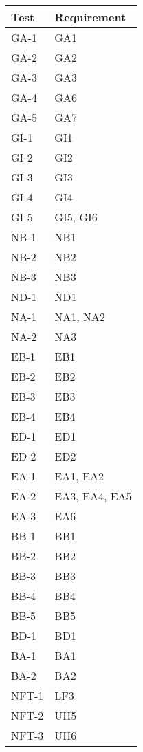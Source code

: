 \documentclass[12pt, titlepage]{article}
\begin{document}
\begin{longtable}{| p{} | p{} |}
    \hline
    Test & Requirement\\
    \hline
    GA-1 & GA1\\
    \hline
    GA-2 & GA2\\
    \hline
    GA-3 & GA3\\
    \hline
    GA-4 & GA6\\
    \hline
    GA-5 & GA7\\
    \hline
    GI-1 & GI1\\
    \hline
    GI-2 & GI2\\
    \hline
    GI-3 & GI3\\
    \hline
    GI-4 & GI4\\
    \hline
    GI-5 & GI5, GI6\\
    \hline
    NB-1 & NB1\\
    \hline
    NB-2 & NB2\\
    \hline
    NB-3 & NB3\\
    \hline
    ND-1 & ND1\\
    \hline
    NA-1 & NA1, NA2\\
    \hline
    NA-2 & NA3\\
    \hline
    EB-1 & EB1\\
    \hline
    EB-2 & EB2\\
    \hline
    EB-3 & EB3\\
    \hline
    EB-4 & EB4\\
    \hline
    ED-1 & ED1\\
    \hline
    ED-2 & ED2\\
    \hline
    EA-1 & EA1, EA2\\
    \hline
    EA-2 & EA3, EA4, EA5\\
    \hline
    EA-3 & EA6\\
    \hline
    BB-1 & BB1\\
    \hline
    BB-2 & BB2\\
    \hline
    BB-3 & BB3\\
    \hline
    BB-4 & BB4\\
    \hline
    BB-5 & BB5\\
    \hline
    BD-1 & BD1\\
    \hline
    BA-1 & BA1\\
    \hline
    BA-2 & BA2\\
    \hline
    NFT-1 & LF3\\
    \hline
    NFT-2 & UH5\\
    \hline
    NFT-3 & UH6\\

\end{longtable}
\end{document}
